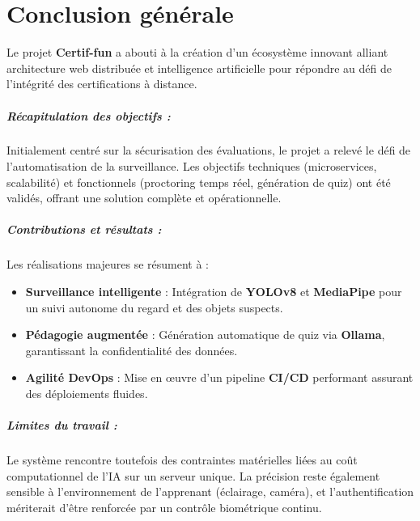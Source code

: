 \chapter*{Conclusion générale}

Le projet \textbf{Certif-fun} a abouti à la création d'un écosystème innovant alliant architecture web distribuée et intelligence artificielle pour répondre au défi de l'intégrité des certifications à distance.

\paragraph{Récapitulation des objectifs :} 
Initialement centré sur la sécurisation des évaluations, le projet a relevé le défi de l'automatisation de la surveillance. Les objectifs techniques (microservices, scalabilité) et fonctionnels (proctoring temps réel, génération de quiz) ont été validés, offrant une solution complète et opérationnelle.

\paragraph{Contributions et résultats :} 
Les réalisations majeures se résument à :
\begin{itemize}[noitemsep, topsep=1pt]
    \item \textbf{Surveillance intelligente} : Intégration de \textbf{YOLOv8} et \textbf{MediaPipe} pour un suivi autonome du regard et des objets suspects.
    \item \textbf{Pédagogie augmentée} : Génération automatique de quiz via \textbf{Ollama}, garantissant la confidentialité des données.
    \item \textbf{Agilité DevOps} : Mise en œuvre d'un pipeline \textbf{CI/CD} performant assurant des déploiements fluides.
\end{itemize}

\paragraph{Limites du travail :} 
Le système rencontre toutefois des contraintes matérielles liées au coût computationnel de l'IA sur un serveur unique. La précision reste également sensible à l'environnement de l'apprenant (éclairage, caméra), et l'authentification mériterait d'être renforcée par un contrôle biométrique continu.

